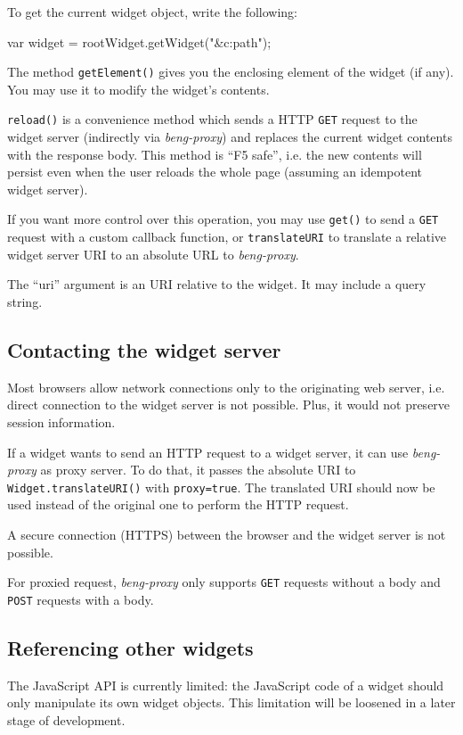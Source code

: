 \documentclass[a4paper,12pt]{article}
\begin{document}
To get the current widget object, write the following:

\begin{verbatim*}
var widget = rootWidget.getWidget("&c:path");
\end{verbatim*}

The method \texttt{getElement()} gives you the enclosing element of
the widget (if any).  You may use it to modify the widget's contents.

\texttt{reload()} is a convenience method which sends a HTTP
\texttt{GET} request to the widget server (indirectly via
\emph{beng-proxy}) and replaces the current widget contents with the
response body.  This method is ``F5 safe'', i.e. the new contents will
persist even when the user reloads the whole page (assuming an
idempotent widget server).

If you want more control over this operation, you may use
\texttt{get()} to send a \texttt{GET} request with a custom callback
function, or \texttt{translateURI} to translate a relative widget
server URI to an absolute URL to \emph{beng-proxy}.

The ``uri'' argument is an URI relative to the widget.  It may include
a query string.


\subsection{Contacting the widget server}

Most browsers allow network connections only to the originating web
server, i.e. direct connection to the widget server is not possible.
Plus, it would not preserve session information.

If a widget wants to send an HTTP request to a widget server, it can
use \emph{beng-proxy} as proxy server.  To do that, it passes the
absolute URI to \texttt{Widget.translateURI()} with
\texttt{proxy=true}.  The translated URI should now be used instead of
the original one to perform the HTTP request.

A secure connection (HTTPS) between the browser and the widget server
is not possible.

For proxied request, \emph{beng-proxy} only supports \texttt{GET}
requests without a body and \texttt{POST} requests with a body.


\subsection{Referencing other widgets}

The JavaScript API is currently limited: the JavaScript code of a
widget should only manipulate its own widget objects.  This limitation
will be loosened in a later stage of development.
\end{document}
